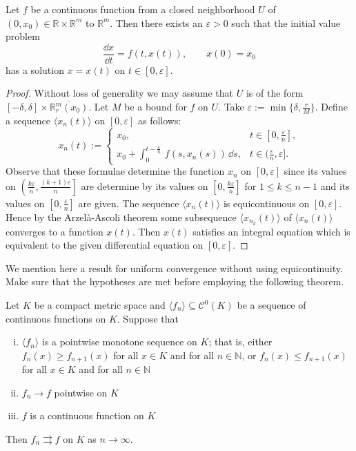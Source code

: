\documentclass[11pt]{article}
\begin{document}
\begin{thm}
  Let $f$ be a continuous function from a closed neighborhood $U$ of $(0, x_0) \in \mathbb{R} \times \mathbb{R}^m$ to $\mathbb{R}^m$.
  Then there exists an $\varepsilon > 0$ such that the initial value problem
  \[
    \frac{\dd x}{\dd t} = f\left( t, x(t) \right), \qquad x(0) = x_0
  \]
  has a solution $x = x(t)$ on $t \in [0, \varepsilon]$.
\end{thm}

\begin{proof}
  Without loss of generality we may assume that $U$ is of the form $[-\delta, \delta] \times \overline{\mathbb{R}^m_r(x_0)}$.
  Let $M$ be a bound for $f$ on $U$.
  Take $\varepsilon := \min \{ \delta, \frac{r}{M} \}$.
  Define a sequence $\langle x_n(t) \rangle$ on $[0, \varepsilon]$ as follows:
  \[
    x_n(t) :=
    \begin{cases}
      x_0, & t \in [0, \frac{\varepsilon}{n}], \\
      x_0 + \int_0^{t-\frac{\varepsilon}{n}} \, f(s, x_n(s)) \, \dd s, & t \in (\frac{\varepsilon}{n}, \varepsilon].
    \end{cases}
  \]
  Observe that these formulae determine the function $x_n$ on $[0, \varepsilon]$ since its values on $\displaystyle \left( \frac{k\varepsilon}{n}, \frac{(k+1)\varepsilon}{n} \right]$ are determine by its values on $\left[ 0, \frac{k\varepsilon}{n} \right]$ for $1 \leqslant k \leqslant n-1$ and its values on $\left[ 0, \frac{\varepsilon}{n} \right]$ are given.
  The sequence $\langle x_n(t) \rangle$ is equicontinuous on $[0,\varepsilon]$.
  Hence by the Arzel\`a-Ascoli theorem some subsequence $\langle x_{n_k}(t) \rangle$ of $\langle x_n(t) \rangle$ converges to a function $x(t)$.
  Then $x(t)$ satisfies an integral equation which is equivalent to the given differential equation on $[0,\varepsilon]$.
\end{proof}

We mention here a result for uniform convergence without using equicontinuity.
Make sure that the hypotheses are met before employing the following theorem.

\begin{thm}[Dini]
  Let $K$ be a compact metric space and $\langle f_n \rangle \subseteq \mathcal{C}^0(K)$ be a sequence of continuous functions on $K$.
  Suppose that
  \begin{enumerate}[(i)]
    \item $\langle f_n \rangle$ is a pointwise monotone sequence on $K$; that is, either $f_n(x) \geqslant f_{n+1}(x)$ for all $x \in K$ and for all $n \in \mathbb{N}$, or $f_n(x) \leqslant f_{n+1}(x)$ for all $x \in K$ and for all $n \in \mathbb{N}$
    \item $f_n \to f$ pointwise on $K$
    \item $f$ is a continuous function on $K$
  \end{enumerate}
  Then $f_n \rightrightarrows f$ on $K$ as $n \to \infty$.
\end{thm}
\end{document}
